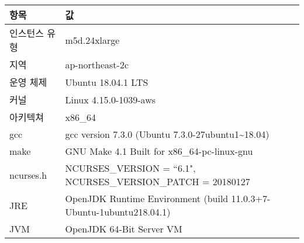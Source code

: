 \begin{tabularx}{\linewidth}{l|X}
    항목 & 값 \\
    \hline
    인스턴스 유형 & m5d.24xlarge \\
    지역 & ap-northeast-2c \\
    \hline
    운영 체제 & Ubuntu 18.04.1 LTS \\
    커널 & Linux 4.15.0-1039-aws \\
    아키텍쳐 & x86_64 \\
    \hline
    gcc & gcc version 7.3.0 (Ubuntu 7.3.0-27ubuntu1\textasciitilde{}18.04) \\
    make & GNU Make 4.1 Built for x86_64-pc-linux-gnu \\
    ncurses.h & NCURSES_VERSION = ``6.1", NCURSES_VERSION_PATCH = 20180127 \\
    \hline
    JRE & OpenJDK Runtime Environment (build 11.0.3+7-Ubuntu-1ubuntu218.04.1) \\
    JVM & OpenJDK 64-Bit Server VM \\
\end{tabularx}